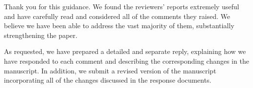 Thank you for this guidance. We found the reviewers' reports extremely useful and have carefully read and considered all of the comments they raised. We believe we have been able to address the vast majority of them, substantially strengthening the paper.

As requested, we have prepared a detailed and separate reply, explaining how we have responded to each comment and describing the corresponding changes in the manuscript. In addition, we submit a revised version of the manuscript incorporating all of the changes discussed in the response documents.
